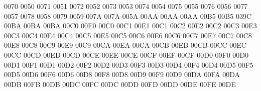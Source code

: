 0070 0050 %
 0071 0051 %
 0072 0052 %
 0073 0053 %
 0074 0054 %
 0075 0055 %
 0076 0056 %
 0077 0057 %
 0078 0058 %
 0079 0059 %
\setcclcucx 007A 007A 005A %
\setcclcucx 00AA 00AA 00AA %
\setcclcucx 00B5 00B5 039C %
\setcclcucx 00BA 00BA 00BA %
\setcclcucx 00C0 00E0 00C0 %
\setcclcucx 00C1 00E1 00C1 %
\setcclcucx 00C2 00E2 00C2 %
\setcclcucx 00C3 00E3 00C3 %
\setcclcucx 00C4 00E4 00C4 %
\setcclcucx 00C5 00E5 00C5 %
\setcclcucx 00C6 00E6 00C6 %
\setcclcucx 00C7 00E7 00C7 %
\setcclcucx 00C8 00E8 00C8 %
\setcclcucx 00C9 00E9 00C9 %
\setcclcucx 00CA 00EA 00CA %
\setcclcucx 00CB 00EB 00CB %
\setcclcucx 00CC 00EC 00CC %
\setcclcucx 00CD 00ED 00CD %
\setcclcucx 00CE 00EE 00CE %
\setcclcucx 00CF 00EF 00CF %
\setcclcucx 00D0 00F0 00D0 %
\setcclcucx 00D1 00F1 00D1 %
\setcclcucx 00D2 00F2 00D2 %
\setcclcucx 00D3 00F3 00D3 %
\setcclcucx 00D4 00F4 00D4 %
\setcclcucx 00D5 00F5 00D5 %
\setcclcucx 00D6 00F6 00D6 %
\setcclcucx 00D8 00F8 00D8 %
\setcclcucx 00D9 00F9 00D9 %
\setcclcucx 00DA 00FA 00DA %
\setcclcucx 00DB 00FB 00DB %
\setcclcucx 00DC 00FC 00DC %
\setcclcucx 00DD 00FD 00DD %
\setcclcucx 00DE 00FE 00DE %
